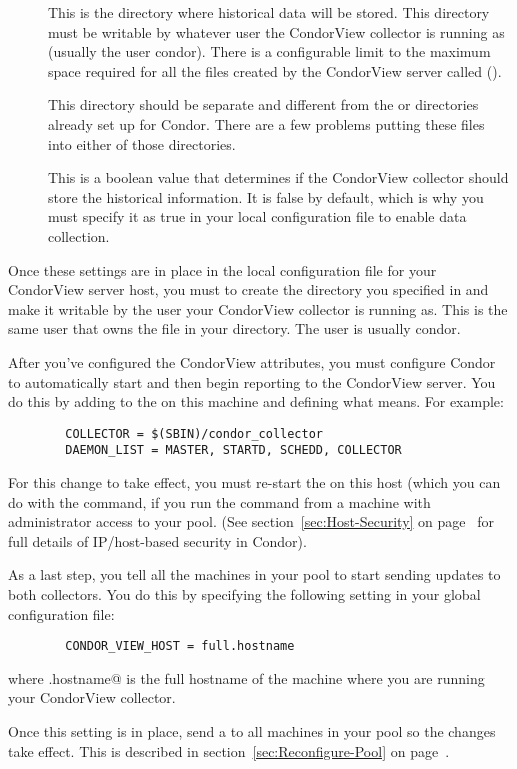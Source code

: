 \begin{description}

\item[] This is the directory where
historical data will be stored.
This directory must be writable by whatever user the CondorView
collector is running as (usually the user condor).  
There is a configurable limit to the maximum space required for all
the files created by the CondorView server called
(). 

\Note This directory should be separate and different from the
 or  directories already set up for
Condor.
There are a few problems putting these files into either of those
directories.

\item[] This is a boolean value that determines
if the CondorView collector should store the historical information.
It is false by default, which is why you must specify it as true in
your local configuration file to enable data collection.

\end{description}

Once these settings are in place in the local configuration file for your
CondorView server host, you must to create the directory you specified
in  and make it writable by the user your
CondorView collector is running as.
This is the same user that owns the  file in
your  directory. The user is usually condor.

After you've configured the CondorView attributes, you must configure Condor
to automatically start and then begin reporting to the CondorView server.
You do this by adding  to the  on
this machine and defining what  means.
For example:
\begin{verbatim}
        COLLECTOR = $(SBIN)/condor_collector
        DAEMON_LIST = MASTER, STARTD, SCHEDD, COLLECTOR
\end{verbatim}
For this change to take effect, you must re-start the
 on this host (which you can do with the
 command, if you run the command from a machine with 
administrator access to your pool.
(See section~\ref{sec:Host-Security} on
page~\pageref{sec:Host-Security} for full details of IP/host-based
security in Condor).

As a last step, you tell all the machines in your pool to start sending
updates to both collectors.
You do this by specifying the following setting in your global
configuration file:
\begin{verbatim}
        CONDOR_VIEW_HOST = full.hostname
\end{verbatim}
where \verb@full.hostname@ is the full hostname of the machine where you
are running your CondorView collector.

Once this setting is in place, send a
 to all machines in your pool so the changes take
effect.
This is described in section~\ref{sec:Reconfigure-Pool} on
page~\pageref{sec:Reconfigure-Pool}.

